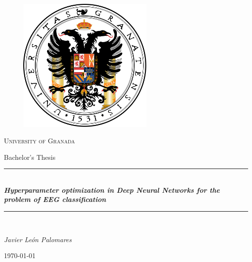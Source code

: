 \documentclass[11pt,a4paper]{article}
\newcommand{\horrule}[1]{\rule{\linewidth}{#1}}
\begin{document}
    \begin{titlepage}

        \centering

        \begin{figure}[h]

            \centering
            \includegraphics[width=0.6\textwidth]{img/logo-ugr.png}

        \end{figure}

        \vspace{1cm}

        {\scshape\LARGE University of Granada}

        \vspace{1cm}

        {\LARGE Bachelor's Thesis}

        \vspace{1cm}

        \horrule{0.5pt} \\[0.4cm]

        {\huge\bfseries\textit{Hyperparameter optimization in Deep Neural Networks for the problem of EEG classification}} \\

        \horrule{2pt} \\[0.5cm]

        \vspace{1cm}

        {\itshape\large Javier León Palomares}

        \vfill

        {\Large\today}

    \end{titlepage}

\newpage
\end{document}
